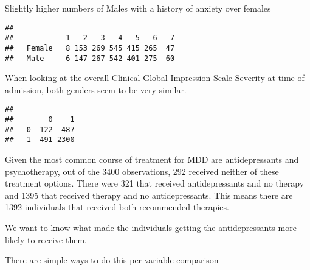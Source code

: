 \documentclass[
]{article}
\newenvironment{Shaded}{\begin{snugshade}}{\end{snugshade}}
\newcommand{\FunctionTok}[1]{\textcolor[rgb]{0.13,0.29,0.53}{\textbf{#1}}}
\newcommand{\NormalTok}[1]{#1}
\newcommand{\OtherTok}[1]{\textcolor[rgb]{0.56,0.35,0.01}{#1}}
\newcommand{\SpecialCharTok}[1]{\textcolor[rgb]{0.81,0.36,0.00}{\textbf{#1}}}
\begin{document}
Slightly higher numbers of Males with a history of anxiety over females

\begin{Shaded}
\end{Shaded}

\begin{verbatim}
##         
##            1   2   3   4   5   6   7
##   Female   8 153 269 545 415 265  47
##   Male     6 147 267 542 401 275  60
\end{verbatim}

When looking at the overall Clinical Global Impression Scale Severity at
time of admission, both genders seem to be very similar.

\begin{Shaded}
\end{Shaded}

\begin{verbatim}
##    
##        0    1
##   0  122  487
##   1  491 2300
\end{verbatim}

Given the most common course of treatment for MDD are antidepressants
and psychotherapy, out of the 3400 observations, 292 received neither of
these treatment options. There were 321 that received antidepressants
and no therapy and 1395 that received therapy and no antidepressants.
This means there are 1392 individuals that received both recommended
therapies.

We want to know what made the individuals getting the antidepressants
more likely to receive them.

There are simple ways to do this per variable comparison

\begin{Shaded}
\end{Shaded}
\end{document}
